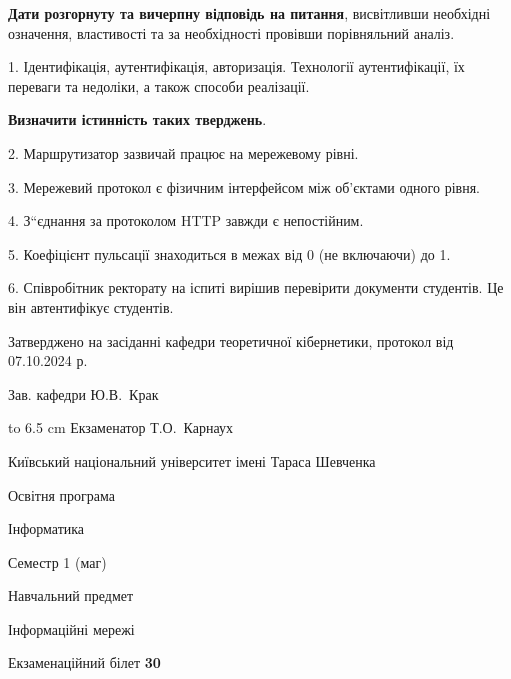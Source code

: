 \documentclass[12pt, ukrainian]{article}
\begin{document}
{
\qquad\textbf{Дати розгорнуту та вичерпну відповідь на питання}, висвітливши необхідні означення, властивості та за необхідності провівши порівняльний аналіз.

1. Ідентифікація, аутентифікація, авторизація. Технології аутентифікації, їх переваги та недоліки, а також способи реалізації.



\qquad\textbf{Визначити істинність таких тверджень}.

2. Маршрутизатор зазвичай працює на мережевому рівні.


3. Мережевий протокол є фізичним інтерфейсом між об'єктами одного рівня.


4. З“єднання за протоколом  HTTP завжди є непостійним.


5. Коефіцієнт пульсації знаходиться в межах від 0 (не включаючи) до 1.


6. Співробітник ректорату на іспиті вирішив перевірити документи студентів. Це він автентифікує студентів.

}
{\smallskip\smallskip \begin {scriptsize} Затверджено на засіданні кафедри теоретичної кібернетики, протокол   від   07.10.2024 р.\par\smallskip\smallskip\smallskip\smallskip
{\parbox {6.5 cm} {Зав. кафедри \dotfill Ю.В.~Крак}}\hspace {0.7cm} {\hbox to 6.5 cm { Екзаменатор \dotfill Т.О.~Карнаух}} \end{scriptsize}}
\vspace{0.9cm}
{{\begin {scriptsize}\par
{ \center  Київський національний університет імені Тараса Шевченка \par}
{\parbox {5 cm}{Освітня програма \hfill}{\parbox {7 cm}{Інформатика\hfill}}\parbox {6 cm}{\hfill Семестр 1 (маг)}}\par
{\parbox {5 cm} {Навчальний предмет \hfill}\parbox {7 cm}{Інформаційні мережі \hfill}\parbox {6cm}{\hfill}\par}\vspace{-15pt} \end{scriptsize}}{\center Екзаменаційний білет \No \textbf { 30 }\par}}
\end{document}
